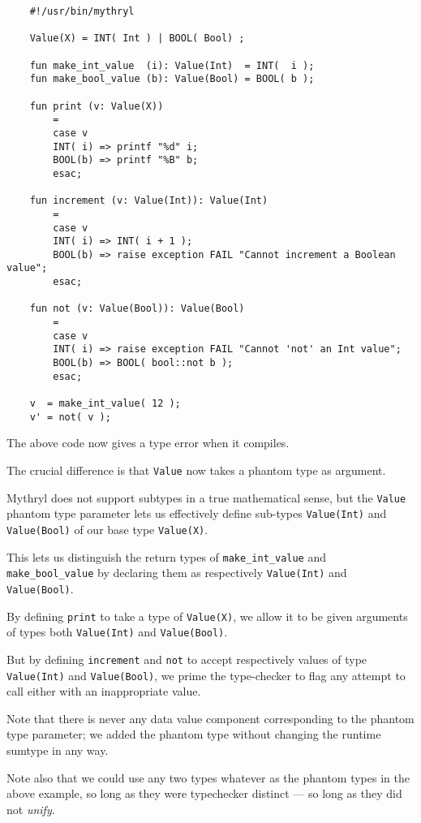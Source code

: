 \begin{verbatim}
    #!/usr/bin/mythryl

    Value(X) = INT( Int ) | BOOL( Bool) ; 

    fun make_int_value  (i): Value(Int)  = INT(  i );
    fun make_bool_value (b): Value(Bool) = BOOL( b );

    fun print (v: Value(X))
        =
        case v
        INT( i) => printf "%d" i;
        BOOL(b) => printf "%B" b;
        esac;
       
    fun increment (v: Value(Int)): Value(Int)
        =
        case v
        INT( i) => INT( i + 1 );
        BOOL(b) => raise exception FAIL "Cannot increment a Boolean value";
        esac;

    fun not (v: Value(Bool)): Value(Bool)
        =
        case v
        INT( i) => raise exception FAIL "Cannot 'not' an Int value";
        BOOL(b) => BOOL( bool::not b );
        esac;

    v  = make_int_value( 12 );
    v' = not( v );
\end{verbatim}

The above code now gives a type error when it compiles.

The crucial difference is that {\tt Value} now takes a phantom type as argument.

Mythryl does not support subtypes in a true mathematical sense, 
but the {\tt Value} phantom type parameter lets us effectively define 
sub-types {\tt Value(Int)} and {\tt Value(Bool)} of our base 
type {\tt Value(X)}.

This lets us distinguish the return types of {\tt make\_int\_value} 
and {\tt make\_bool\_value} by declaring them as respectively 
{\tt Value(Int)} and {\tt Value(Bool)}.

By defining {\tt print} to take a type of {\tt Value(X)}, we allow it 
to be given arguments of types both {\tt Value(Int)} and {\tt Value(Bool)}.

But by defining {\tt increment} and {\tt not} to accept respectively values of 
type {\tt Value(Int)} and {\tt Value(Bool)}, we prime the type-checker to flag any 
attempt to call either with an inappropriate value.

Note that there is never any data value component corresponding to the phantom 
type parameter;  we added the phantom type without changing the runtime sumtype 
in any way.

Note also that we could use any two types whatever as the 
phantom types in the above example, so long as they were typechecker distinct 
--- so long as they did not {\it unify}.


